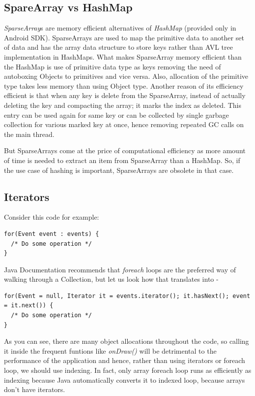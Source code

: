 \documentclass[journal]{IEEEtran}
\begin{document}
\subsection{SpareArray vs HashMap}
\emph{SparseArray}s \cite{sparsearray} are memory efficient alternatives of \emph{HashMap} (provided only in Android SDK). SparseArrays are used to map the primitive data to another set of data and has the array data structure to store keys rather than AVL tree implementation in HashMaps. What makes SparseArray memory efficient than the HashMap is use of primitive data type as keys removing the need of autoboxing Objects to primitives and vice versa. Also, allocation of the primitive type takes less memory than using Object type. Another reason of its efficiency efficient is that when any key is delete from the SparseArray, instead of actually deleting the key and compacting the array; it marks the index as deleted. This entry can be used again for same key or can be collected by single garbage collection for various marked key at once, hence removing repeated GC calls on the main thread.

But SparseArrays come at the price of computational efficiency as more amount of time is needed to extract an item from SparseArray than a HashMap. So, if the use case of hashing is important, SparseArrays are obsolete in that case.

\subsection{Iterators}
Consider this code for example:
\begin{verbatim}
for(Event event : events) {
  /* Do some operation */
}
\end{verbatim}

Java Documentation recommends that \textit{foreach} loops are the preferred way of walking through a Collection, but let us look how that translates into -
\begin{verbatim}
for(Event = null, Iterator it = events.iterator(); it.hasNext(); event = it.next()) {
  /* Do some operation */
}
\end{verbatim}
As you can see, there are many object allocations throughout the code, so calling it inside the frequent funtions like \textit{onDraw()} will be detrimental to the performance of the application and hence, rather than using iterators or foreach loop, we should use indexing. In fact, only array foreach loop runs as efficiently as indexing because Java automatically converts it to indexed loop, because arrays don't have iterators.
\end{document}

